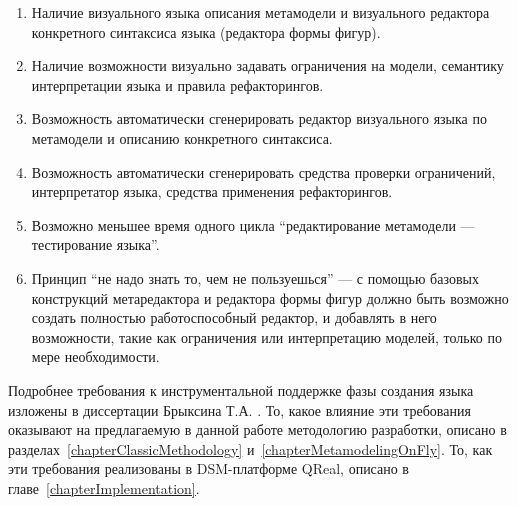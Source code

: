 \begin{enumerate}
	\item Наличие визуального языка описания метамодели и визуального редактора конкретного 
		синтаксиса языка (редактора формы фигур).
	\item Наличие возможности визуально задавать ограничения на модели, семантику интерпретации 
		языка и правила рефакторингов.
	\item Возможность автоматически сгенерировать редактор визуального языка по метамодели 
		и описанию конкретного синтаксиса.
	\item Возможность автоматически сгенерировать средства проверки ограничений, интерпретатор 
		языка, средства применения рефакторингов.
	\item Возможно меньшее время одного цикла "`редактирование метамодели --- тестирование языка"'.
	\item Принцип "`не надо знать то, чем не пользуешься"' --- с помощью базовых конструкций 
		метаредактора и редактора формы фигур должно быть возможно создать полностью работоспособный 
		редактор, и добавлять в него возможности, такие как ограничения или интерпретацию моделей, 
		только по мере необходимости.
\end{enumerate}

Подробнее требования к инструментальной поддержке фазы создания языка изложены в диссертации 
Брыксина Т.А.
. То, какое влияние эти требования оказывают на предлагаемую в данной работе методологию 
разработки, описано в разделах~\ref{chapterClassicMethodology} и~\ref{chapterMetamodelingOnFly}. 
То, как эти требования реализованы в DSM-платформе QReal, описано в главе~\ref{chapterImplementation}.

